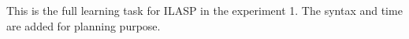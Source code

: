 This is the full learning task for ILASP in the experiment 1. 
The syntax and time are added for planning purpose. 

